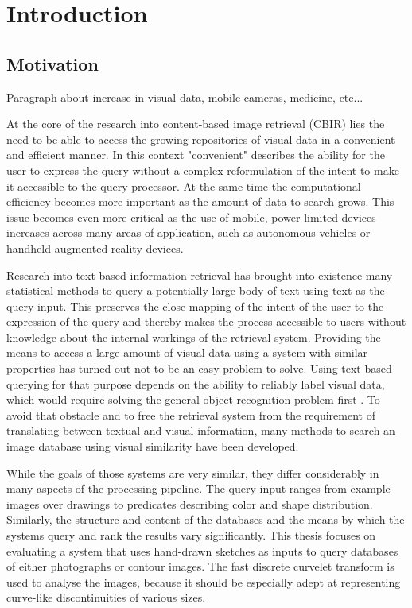 \chapter{Introduction}\label{ch:introduction}

\section{Motivation}

Paragraph about increase in visual data, mobile cameras, medicine, etc...

At the core of the research into content-based image retrieval (CBIR) lies the
need to be able to access the growing repositories of visual data in a
convenient and efficient manner.  In this context "convenient" describes the
ability for the user to express the query without a complex reformulation of
the intent to make it accessible to the query processor. At the same time the
computational efficiency becomes more important as the amount of data to search
grows. This issue becomes even more critical as the use of mobile,
power-limited devices increases across many areas of application, such as
autonomous vehicles or handheld augmented reality devices.

Research into text-based information retrieval has brought into existence many
statistical methods to query a potentially large body of text using text as the
query input. This preserves the close mapping of the intent of the user to the
expression of the query and thereby makes the process accessible to users
without knowledge about the internal workings of the retrieval system.
Providing the means to access a large amount of visual data using a system with
similar properties has turned out not to be an easy problem to solve. Using
text-based querying for that purpose depends on the ability to reliably label
visual data, which would require solving the general object recognition problem
first \autocite{smeulders_content-based_2000}. To avoid that obstacle and to
free the retrieval system from the requirement of translating between textual
and visual information, many methods to search an image database using visual
similarity have been developed.

While the goals of those systems are very similar, they differ considerably in
many aspects of the processing pipeline. The query input ranges from example
images over drawings to predicates describing color and shape distribution.
Similarly, the structure and content of the databases and the means by which
the systems query and rank the results vary significantly. This thesis focuses
on evaluating a system that uses hand-drawn sketches as inputs to query
databases of either photographs or contour images. The fast discrete curvelet
transform \autocite{candes_fast_2006} is used to analyse the images, because it
should be especially adept at representing curve-like discontinuities of
various sizes.

